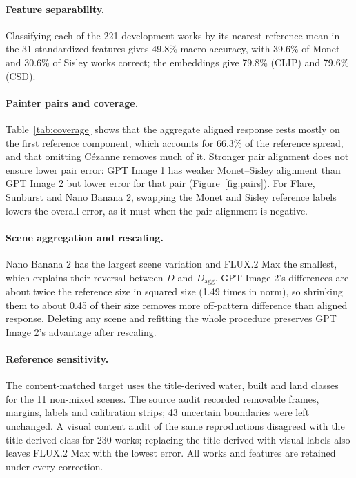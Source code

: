 \paragraph{Feature separability.} Classifying each of the 221 development works by its nearest
reference mean in the 31 standardized features gives 49.8\% macro accuracy, with 39.6\% of Monet
and 30.6\% of Sisley works correct; the embeddings give 79.8\% (CLIP) and 79.6\% (CSD).

\paragraph{Painter pairs and coverage.} Table~\ref{tab:coverage} shows that the aggregate
aligned response rests mostly on the first reference component, which accounts for 66.3\% of
the reference spread, and that omitting C\'ezanne removes much of it. Stronger pair alignment
does not ensure lower pair error: GPT Image 1 has weaker Monet--Sisley alignment than GPT Image
2 but lower error for that pair (Figure~\ref{fig:pairs}). For Flare, Sunburst and Nano Banana
2, swapping the Monet and Sisley reference labels lowers the overall error, as it must when the
pair alignment is negative.

\paragraph{Scene aggregation and rescaling.} Nano Banana 2 has the largest scene variation and
FLUX.2 Max the smallest, which explains their reversal between $D$ and $D_{\mathrm{agg}}$. GPT
Image 2's differences are about twice the reference size in squared size (1.49 times in norm), so
shrinking them to about 0.45 of their size removes more off-pattern difference than aligned
response. Deleting any scene and
refitting the whole procedure preserves GPT Image 2's advantage after rescaling.

\paragraph{Reference sensitivity.} The content-matched target uses the title-derived water,
built and land classes for the 11 non-mixed scenes. The source audit recorded removable
frames, margins, labels and calibration strips; 43 uncertain boundaries were left unchanged. A
visual content audit of the same reproductions disagreed with the title-derived class for 230
works; replacing the title-derived with visual labels also leaves FLUX.2 Max with the lowest
error. All works and features are retained under every correction.

